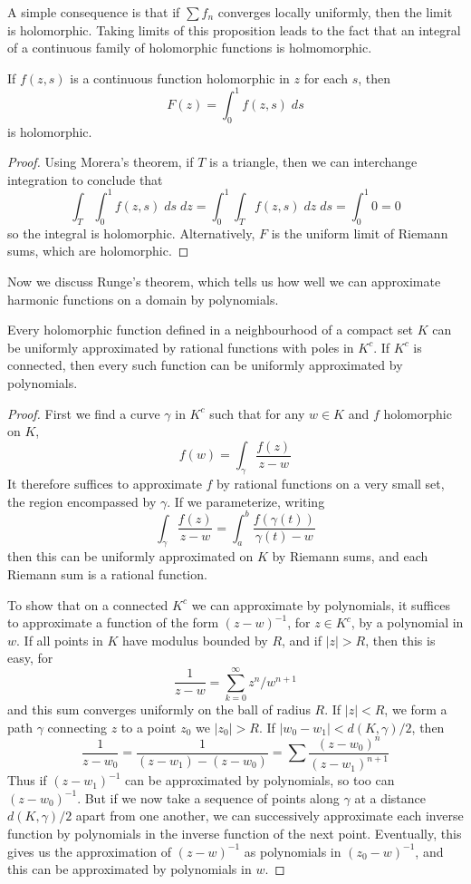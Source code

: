 A simple consequence is that if $\sum f_n$ converges locally uniformly, then the limit is holomorphic. Taking limits of this proposition leads to the fact that an integral of a continuous family of holomorphic functions is holmomorphic.

\begin{theorem}
    If $f(z,s)$ is a continuous function holomorphic in $z$ for each $s$, then
    \[ F(z) = \int_0^1 f(z,s)\; ds \]
    is holomorphic.
\end{theorem}
\begin{proof}
    Using Morera's theorem, if $T$ is a triangle, then we can interchange integration to conclude that
    \[ \int_T \int_0^1 f(z,s)\; ds\; dz = \int_0^1 \int_T f(z,s)\; dz\; ds = \int_0^1 0 = 0 \]
    so the integral is holomorphic. Alternatively, $F$ is the uniform limit of Riemann sums, which are holomorphic.
\end{proof}

Now we discuss Runge's theorem, which tells us how well we can approximate harmonic functions on a domain by polynomials.

\begin{theorem}[Runge]
    Every holomorphic function defined in a neighbourhood of a compact set $K$ can be uniformly approximated by rational functions with poles in $K^c$. If $K^c$ is connected, then every such function can be uniformly approximated by polynomials.
\end{theorem}
\begin{proof}
    First we find a curve $\gamma$ in $K^c$ such that for any $w \in K$ and $f$ holomorphic on $K$,
    \[ f(w) = \int_\gamma \frac{f(z)}{z - w} \]
    It therefore suffices to approximate $f$ by rational functions on a very small set, the region encompassed by $\gamma$. If we parameterize, writing
    \[ \int_\gamma \frac{f(z)}{z - w} = \int_a^b \frac{f(\gamma(t))}{\gamma(t) - w} \]
    then this can be uniformly approximated on $K$ by Riemann sums, and each Riemann sum is a rational function.

    To show that on a connected $K^c$ we can approximate by polynomials, it suffices to approximate a function of the form $(z - w)^{-1}$, for $z \in K^c$, by a polynomial in $w$. If all points in $K$ have modulus bounded by $R$, and if $|z| > R$, then this is easy, for
    \[ \frac{1}{z - w} = \sum_{k = 0}^\infty z^n/w^{n+1} \]
    and this sum converges uniformly on the ball of radius $R$. If $|z| < R$, we form a path $\gamma$ connecting $z$ to a point $z_0$ we $|z_0| > R$. If $|w_0 - w_1| < d(K,\gamma)/2$, then
    \[ \frac{1}{z - w_0} = \frac{1}{(z - w_1) - (z - w_0)} = \sum \frac{(z - w_0)^n}{(z - w_1)^{n+1}} \]
    Thus if $(z - w_1)^{-1}$ can be approximated by polynomials, so too can $(z - w_0)^{-1}$. But if we now take a sequence of points along $\gamma$ at a distance $d(K,\gamma)/2$ apart from one another, we can successively approximate each inverse function by polynomials in the inverse function of the next point. Eventually, this gives us the approximation of $(z - w)^{-1}$ as polynomials in $(z_0 - w)^{-1}$, and this can be approximated by polynomials in $w$.
\end{proof}

